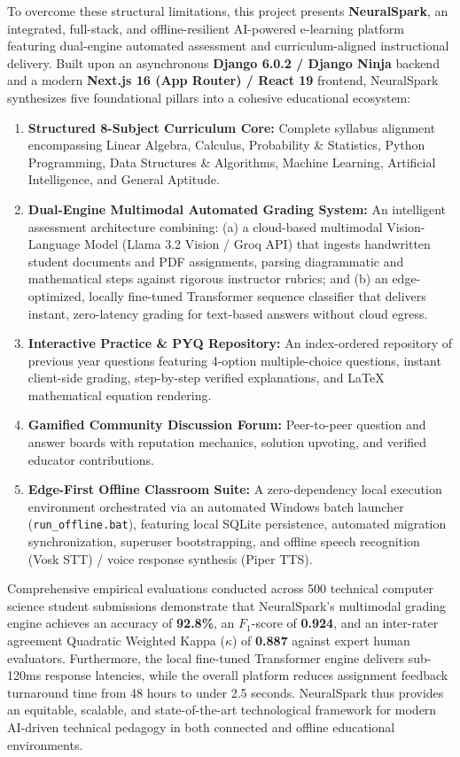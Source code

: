 \documentclass[12pt,a4paper,oneside]{report}
\begin{document}
To overcome these structural limitations, this project presents \textbf{NeuralSpark}, an integrated, full-stack, and offline-resilient AI-powered e-learning platform featuring dual-engine automated assessment and curriculum-aligned instructional delivery. Built upon an asynchronous \textbf{Django 6.0.2 / Django Ninja} backend and a modern \textbf{Next.js 16 (App Router) / React 19} frontend, NeuralSpark synthesizes five foundational pillars into a cohesive educational ecosystem:

\begin{enumerate}[leftmargin=*]
    \item \textbf{Structured 8-Subject Curriculum Core:} Complete syllabus alignment encompassing Linear Algebra, Calculus, Probability \& Statistics, Python Programming, Data Structures \& Algorithms, Machine Learning, Artificial Intelligence, and General Aptitude.
    \item \textbf{Dual-Engine Multimodal Automated Grading System:} An intelligent assessment architecture combining: (a) a cloud-based multimodal Vision-Language Model (Llama 3.2 Vision / Groq API) that ingests handwritten student documents and PDF assignments, parsing diagrammatic and mathematical steps against rigorous instructor rubrics; and (b) an edge-optimized, locally fine-tuned Transformer sequence classifier that delivers instant, zero-latency grading for text-based answers without cloud egress.
    \item \textbf{Interactive Practice \& PYQ Repository:} An index-ordered repository of previous year questions featuring 4-option multiple-choice questions, instant client-side grading, step-by-step verified explanations, and LaTeX mathematical equation rendering.
    \item \textbf{Gamified Community Discussion Forum:} Peer-to-peer question and answer boards with reputation mechanics, solution upvoting, and verified educator contributions.
    \item \textbf{Edge-First Offline Classroom Suite:} A zero-dependency local execution environment orchestrated via an automated Windows batch launcher (\texttt{run\_offline.bat}), featuring local SQLite persistence, automated migration synchronization, superuser bootstrapping, and offline speech recognition (Vosk STT) / voice response synthesis (Piper TTS).
\end{enumerate}

Comprehensive empirical evaluations conducted across 500 technical computer science student submissions demonstrate that NeuralSpark's multimodal grading engine achieves an accuracy of \textbf{92.8\%}, an $F_1$-score of \textbf{0.924}, and an inter-rater agreement Quadratic Weighted Kappa ($\kappa$) of \textbf{0.887} against expert human evaluators. Furthermore, the local fine-tuned Transformer engine delivers sub-120ms response latencies, while the overall platform reduces assignment feedback turnaround time from 48 hours to under 2.5 seconds. NeuralSpark thus provides an equitable, scalable, and state-of-the-art technological framework for modern AI-driven technical pedagogy in both connected and offline educational environments.
\end{document}
